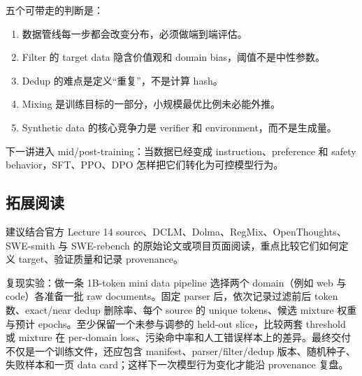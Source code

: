 \documentclass[a4paper]{article}
\begin{document}
五个可带走的判断是：

\begin{enumerate}
\item 数据管线每一步都会改变分布，必须做端到端评估。
\item Filter 的 target data 隐含价值观和 domain bias，阈值不是中性参数。
\item Dedup 的难点是定义“重复”，不是计算 hash。
\item Mixing 是训练目标的一部分，小规模最优比例未必能外推。
\item Synthetic data 的核心竞争力是 verifier 和 environment，而不是生成量。
\end{enumerate}

下一讲进入 mid/post-training：当数据已经变成 instruction、preference 和 safety behavior，SFT、PPO、DPO 怎样把它们转化为可控模型行为。

\subsection{拓展阅读}

建议结合官方 Lecture 14 source、DCLM、Dolma、RegMix、OpenThoughts、SWE-smith 与 SWE-rebench 的原始论文或项目页面阅读，重点比较它们如何定义 target、验证质量和记录 provenance。

\begin{knowledgebox}{复现实验：做一条 1B-token mini data pipeline}
选择两个 domain（例如 web 与 code）各准备一批 raw documents。固定 parser 后，依次记录过滤前后 token 数、exact/near dedup 删除率、每个 source 的 unique tokens、候选 mixture 权重与预计 epochs。至少保留一个未参与调参的 held-out slice，比较两套 threshold 或 mixture 在 per-domain loss、污染命中率和人工错误样本上的差异。最终交付不仅是一个训练文件，还应包含 manifest、parser/filter/dedup 版本、随机种子、失败样本和一页 data card；这样下一次模型行为变化才能沿 provenance 复盘。
\end{knowledgebox}
\end{document}

